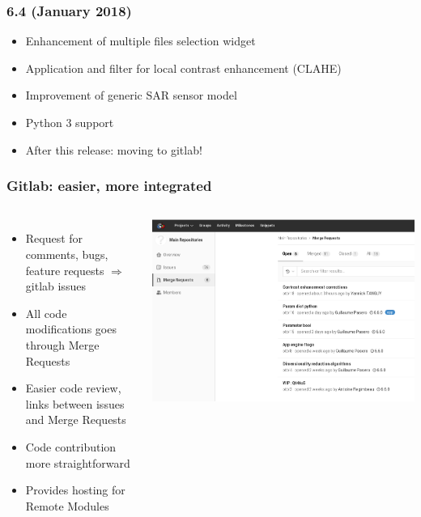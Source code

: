 \begin{frame}
  \frametitle{6.4 (January 2018)}

  \begin{itemize}
  \item Enhancement of multiple files selection widget
  \item Application and filter for local contrast enhancement (CLAHE)
  \item Improvement of generic SAR sensor model
  \item Python 3 support
  \item After this release: moving to gitlab!
  \end{itemize}  
\end{frame}

\begin{frame}
  \frametitle{Gitlab: easier, more integrated}
  \begin{columns}
    \begin{itemize}
    \item Request for comments, bugs, feature requests $\Rightarrow$ gitlab issues
    \item All code modifications goes through Merge Requests
    \item Easier code review, links between issues and Merge Requests
    \item Code contribution more straightforward
    \item Provides hosting for Remote Modules
    \end{itemize}
    \includegraphics[width=\textwidth]{images/gitlab_mr.png}
    \end{columns}
\end{frame}
